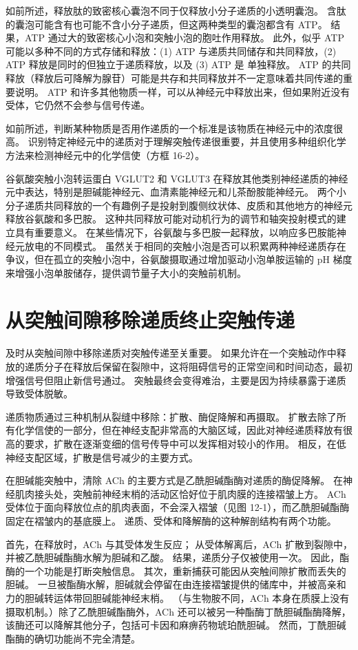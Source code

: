 如前所述，释放肽的致密核心囊泡不同于仅释放小分子递质的小透明囊泡。 含肽的囊泡可能含有也可能不含小分子递质，但这两种类型的囊泡都含有 ATP。 结果，ATP 通过大的致密核心小泡和突触小泡的胞吐作用释放。 此外，似乎 ATP 可能以多种不同的方式存储和释放：(1) ATP 与递质共同储存和共同释放，(2) ATP 释放是同时的但独立于递质释放，以及 (3) ATP 是 单独释放。 ATP 的共同释放（释放后可降解为腺苷）可能是共存和共同释放并不一定意味着共同传递的重要说明。 ATP 和许多其他物质一样，可以从神经元中释放出来，但如果附近没有受体，它仍然不会参与信号传递。

如前所述，判断某种物质是否用作递质的一个标准是该物质在神经元中的浓度很高。 识别特定神经元中的递质对于理解突触传递很重要，并且使用多种组织化学方法来检测神经元中的化学信使（方框 16-2）。

谷氨酸突触小泡转运蛋白 VGLUT2 和 VGLUT3 在释放其他类别神经递质的神经元中表达，特别是胆碱能神经元、血清素能神经元和儿茶酚胺能神经元。 两个小分子递质共同释放的一个有趣例子是投射到腹侧纹状体、皮质和其他地方的神经元释放谷氨酸和多巴胺。 这种共同释放可能对动机行为的调节和轴突投射模式的建立具有重要意义。 在某些情况下，谷氨酸与多巴胺一起释放，以响应多巴胺能神经元放电的不同模式。 虽然关于相同的突触小泡是否可以积累两种神经递质存在争议，但在孤立的突触小泡中，谷氨酸摄取通过增加驱动小泡单胺运输的 pH 梯度来增强小泡单胺储存，提供调节量子大小的突触前机制。


\section{从突触间隙移除递质终止突触传递}
及时从突触间隙中移除递质对突触传递至关重要。 如果允许在一个突触动作中释放的递质分子在释放后保留在裂隙中，这将阻碍信号的正常空间和时间动态，最初增强信号但阻止新信号通过。 突触最终会变得难治，主要是因为持续暴露于递质导致受体脱敏。

递质物质通过三种机制从裂缝中移除：扩散、酶促降解和再摄取。 扩散去除了所有化学信使的一部分，但在神经支配非常高的大脑区域，因此对神经递质释放有很高的要求，扩散在逐渐变细的信号传导中可以发挥相对较小的作用。 相反，在低神经支配区域，扩散是信号减少的主要方式。

在胆碱能突触中，清除 ACh 的主要方式是乙酰胆碱酯酶对递质的酶促降解。 在神经肌肉接头处，突触前神经末梢的活动区恰好位于肌肉膜的连接褶皱上方。 ACh 受体位于面向释放位点的肌肉表面，不会深入褶皱（见图 12-1），而乙酰胆碱酯酶固定在褶皱内的基底膜上。 递质、受体和降解酶的这种解剖结构有两个功能。

首先，在释放时，ACh 与其受体发生反应； 从受体解离后，ACh 扩散到裂隙中，并被乙酰胆碱酯酶水解为胆碱和乙酸。 结果，递质分子仅被使用一次。 因此，酯酶的一个功能是打断突触信息。 其次，重新捕获可能因从突触间隙扩散而丢失的胆碱。 一旦被酯酶水解，胆碱就会停留在由连接褶皱提供的储库中，并被高亲和力的胆碱转运体带回胆碱能神经末梢。 （与生物胺不同，ACh 本身在质膜上没有摄取机制。）除了乙酰胆碱酯酶外，ACh 还可以被另一种酯酶丁酰胆碱酯酶降解，该酶还可以降解其他分子，包括可卡因和麻痹药物琥珀酰胆碱。 然而，丁酰胆碱酯酶的确切功能尚不完全清楚。

